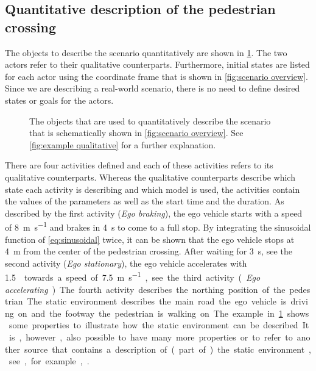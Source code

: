 \subsection{Quantitative description of the pedestrian crossing}
\label{sec:example quantitative}
The objects to describe the scenario quantitatively are shown in \cref{fig:example quantitative}. The two actors refer to their qualitative counterparts. Furthermore, initial states are listed for each actor using the coordinate frame that is shown in \cref{fig:scenario overview}. 
Since we are describing a real-world scenario, there is no need to define desired states or goals for the actors.

\cbend
\begin{figure}
	\centering
	
	\caption{\cbstart The objects that are used to quantitatively describe the scenario that is schematically shown in \cref{fig:scenario overview}. See \cref{fig:example qualitative} for a further explanation.\cbend}
	\label{fig:example quantitative}
\end{figure}
\cbstart

There are four activities defined and each of these activities refers to its qualitative counterparts. Whereas the qualitative counterparts describe which state each activity is describing and which model is used, the activities contain the values of the parameters as well as the start time and the duration. As described by the first activity (\emph{Ego braking}), the ego vehicle starts with a speed of \SI{8}{\meter\per\second} and brakes in \SI{4}{\second} to come to a full stop. By integrating the sinusoidal function of \cref{eq:sinusoidal} twice, it can be shown that the ego vehicle stops at \SI{4}{\meter} from the center of the pedestrian crossing. After waiting for \SI{3}{\second}, see the second activity (\emph{Ego stationary}), the ego vehicle accelerates with \SI{1.5}{\meter\per\second\square} towards a speed of \SI{7.5}{\meter\per\second}, see the third activity (\emph{Ego accelerating}). The fourth activity describes the northing position of the pedestrian.

The static environment describes the main road the ego vehicle is driving on and the footway the pedestrian is walking on. The example in \cref{fig:example quantitative} shows some properties to illustrate how the static environment can be described. It is, however, also possible to have many more properties or to refer to another source that contains a description of (part of) the static environment, see, for example, \cite{dupuis2010opendrive}. 

